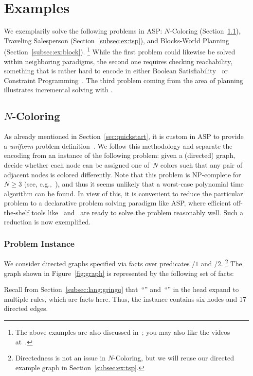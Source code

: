 \section{Examples}\label{sec:examples}

We exemplarily solve the following problems in ASP:
$N$-Coloring (Section~\ref{subsec:ex:color}),
Traveling Salesperson (Section~\ref{subsec:ex:tsp}), and
Blocks-World Planning (Section~\ref{subsec:ex:block}).%
\footnote{The above examples are also discussed in~\cite{gekakasc12a};
  you may also like the videos at~\cite{potassco}.}
While the first problem could likewise be solved within neighboring paradigms,
the second one requires checking reachability,
something that is rather hard to encode in either
Boolean Satisfiability~\cite{SATHandbook} or
Constraint Programming~\cite{CPHandbook}.
The third problem coming from the area of planning
illustrates incremental solving with \clingo.

\subsection{\texorpdfstring{$N$}{N}-Coloring}\label{subsec:ex:color}

As already mentioned in Section~\ref{sec:quickstart},
it is custom in ASP to provide a \emph{uniform}
problem definition~\cite{martru99a,niemela99a,schlipf95a}.
We follow this methodology and separate the encoding
from an instance of the following problem:
given a (directed) graph, decide whether each node can be assigned
one of~$N$ colors such that any pair of adjacent nodes is colored differently.
Note that this problem is NP-complete for~$N\geq 3$
(see, e.g.,~\cite{papadimitriou94a}),
and thus it seems unlikely that a worst-case polynomial time algorithm
can be found.
In view of this,
it is convenient to reduce the particular problem to
a declarative problem solving paradigm like ASP,
where efficient off-the-shelf tools like \gringo\ and \clasp\
are ready to solve the problem reasonably well.
Such a reduction is now exemplified.

\subsubsection{Problem Instance}\label{subsec:color:instance}


We consider directed graphs specified via facts over predicates
/$1$ and /$2$.%
\footnote{%
  Directedness is not an issue in $N$-Coloring,
  but we will reuse our directed example graph in Section~\ref{subsec:ex:tsp}.}
The graph shown in Figure~\ref{fig:graph} is represented by the following set of facts:
%

%
Recall from Section~\ref{subsec:lang:gringo} that~``'' and~``\code{;}''
in the head expand to multiple rules, which are facts here.
Thus, the instance contains six nodes and 17 directed edges.

